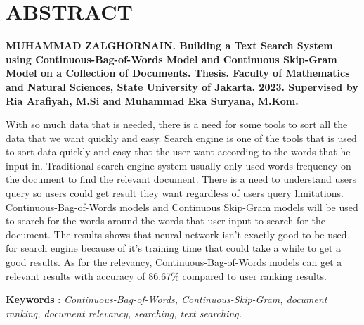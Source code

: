 \documentclass[12pt]{report}
\begin{document}
\section*{ABSTRACT}
\hfill \break
{\parindent0pt
\textbf{MUHAMMAD ZALGHORNAIN. Building a Text Search System using Continuous-Bag-of-Words Model and Continuous Skip-Gram Model on a Collection of Documents. Thesis. Faculty of Mathematics and Natural Sciences, State University of Jakarta. 2023. Supervised by Ria Arafiyah, M.Si and Muhammad Eka Suryana, M.Kom.}
\newline

With so much data that is needed, there is a need for some tools to sort all the data that we want quickly and easy. Search engine is one of the tools that is used to sort data quickly and easy that the user want according to the words that he input in. Traditional search engine system usually only used words frequency on the document to find the relevant document. There is a need to understand users query so users could get result they want regardless of users query limitations. Continuous-Bag-of-Words models and Continuous Skip-Gram models will be used to search for the words around the words that user input to search for the document. The results shows that neural network isn't exactly good to be used for search engine because of it's training time that could take a while to get a good results. As for the relevancy, Continuous-Bag-of-Words models can get a relevant results with accuracy of 86.67\% compared to user ranking results.
\newline

\textbf{Keywords} : \textit{Continuous-Bag-of-Words, Continuous-Skip-Gram, document ranking, document relevancy, searching, text searching.}
}
\linespread{1.6}


\cleardoublepage
{}
\setlength{\cftbeforetoctitleskip}{0pt}
\setlength{\cftaftertoctitleskip}{20pt}
\renewcommand{\contentsname}{\hfill\bfseries\normalsize DAFTAR ISI \hfill}   
\renewcommand{\cftaftertoctitle}{\hfill}
\renewcommand{\listfigurename}{\hfill\bfseries\normalsize DAFTAR GAMBAR}
\renewcommand{\cftafterloftitle}{\hfill}
\renewcommand{\listtablename}{\hfill\bfseries\normalsize DAFTAR TABEL \hfill}
\renewcommand{\cftafterloftitle}{\hfill}
\tableofcontents


\cleardoublepage
{}
\setlength{\cftbeforeloftitleskip}{0pt}
\setlength{\cftafterloftitleskip}{20pt}
\listoffigures
\end{document}
